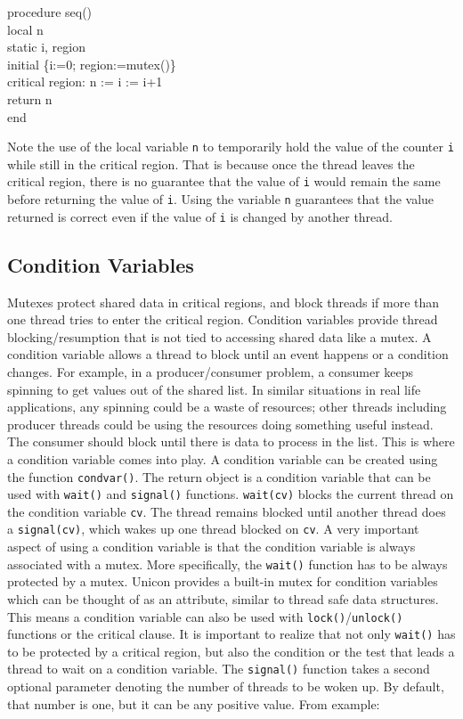\begin{iconcode}
procedure seq()\\
\>local n\\
\>static i, region\\
\>initial \{i:=0; region:=mutex()\}\\
\>critical region: n := i := i+1\\
\>return n\\
end \\
\end{iconcode}

Note the use of the local variable \texttt{n} to temporarily hold the value
of the counter \texttt{i} while still in the critical region. That is
because once the thread leaves the critical region, there is no guarantee
that the value of \texttt{i} would remain the same before returning the
value of \texttt{i}.  Using the variable \texttt{n} guarantees that the
value returned is correct even if the value of \texttt{i} is changed by
another thread.

\subsection{Condition Variables}
Mutexes protect shared data in critical regions, and block threads if more
than one thread tries to enter the critical region. Condition variables
provide thread blocking/resumption that is not tied to accessing shared
data like a mutex. A condition variable allows a thread to block until an
event happens or a condition changes. For example, in a producer/consumer
problem, a consumer keeps spinning to get values out of the shared list. In
similar situations in real life applications, any spinning could be a waste
of resources; other threads including producer threads could be using the
resources doing something useful instead. The consumer should block until
there is data to process in the list. This is where a condition variable
comes into play.  A condition variable can be created using the function
\texttt{condvar()}.  The return object is a condition variable that can be
used with \texttt{wait()} and \texttt{signal()}
functions. \texttt{wait(cv)} blocks the current thread on the condition
variable \texttt{cv}. The thread remains blocked until another thread does
a \texttt{signal(cv)}, which wakes up one thread blocked on \texttt{cv}. A
very important aspect of using a condition variable is that the condition
variable is always associated with a mutex. More specifically, the
\texttt{wait()} function has to be always protected by a mutex.  Unicon
provides a built-in mutex for condition variables which can be thought of
as an attribute, similar to thread safe data structures. This means a
condition variable can also be used with \texttt{lock()}/\texttt{unlock()}
functions or the critical clause. It is important to realize that not only
\texttt{wait()} has to be protected by a critical region, but also the
condition or the test that leads a thread to wait on a condition
variable. The \texttt{signal()} function takes a second optional parameter
denoting the number of threads to be woken up.  By default, that number is
one, but it can be any positive value. From example:

